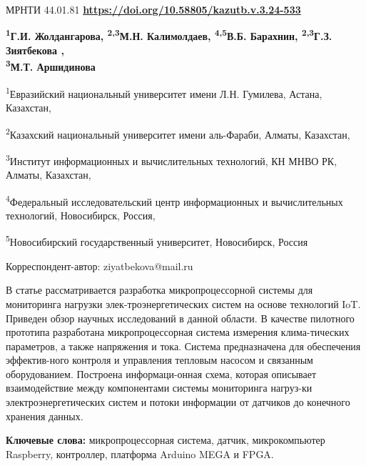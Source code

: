 \newpage
МРНТИ 44.01.81
\hfill {\bfseries \href{https://doi.org/10.58805/kazutb.v.3.24-533}{https://doi.org/10.58805/kazutb.v.3.24-533}}


\begin{center}
{\bfseries \textsuperscript{1}Г.И. Жолдангарова, \textsuperscript{2,3}М.Н.
Калимолдаев, \textsuperscript{4,5}В.Б. Барахнин,
\textsuperscript{2,3}Г.З. Зиятбекова \envelope,\\ \textsuperscript{3}М.Т. Аршидинова}

\textsuperscript{1}Евразийский национальный университет имени Л.Н.
Гумилева, Астана, Казахстан,

\textsuperscript{2}Казахский национальный университет имени аль-Фараби,
Алматы, Казахстан,

\textsuperscript{3}Институт информационных и вычислительных технологий,
КН МНВО РК, Алматы, Казахстан,

\textsuperscript{4}Федеральный исследовательский центр информационных и
вычислительных технологий, Новосибирск, Россия,

\textsuperscript{5}Новосибирский государственный университет,
Новосибирск, Россия
\end{center}
\envelope Корреспондент-автор: ziyatbekova@mail.ru \vspace{0.5cm}

В статье рассматривается разработка микропроцессорной системы для
мониторинга нагрузки элек-троэнергетических систем на основе технологий
IoT. Приведен обзор научных исследований в данной области. В качестве
пилотного прототипа разработана микропроцессорная система измерения
клима-тических параметров, а также напряжения и тока. Система
предназначена для обеспечения эффектив-ного контроля и управления
тепловым насосом и связанным оборудованием. Построена информаци-онная
схема, которая описывает взаимодействие между компонентами системы
мониторинга нагруз-ки электроэнергетических систем и потоки информации от
датчиков до конечного хранения данных.

{\bfseries Ключевые слова:} микропроцессорная система, датчик,
микрокомпьютер Raspberry, контроллер, платформа Arduino MEGA и FPGA.



